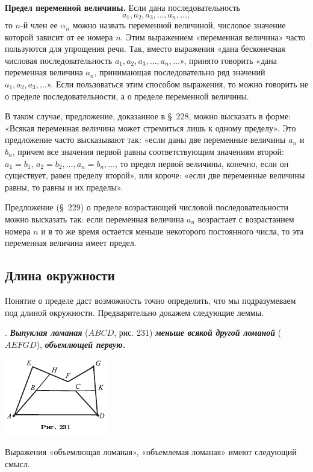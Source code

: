 \documentclass[oneside]{book}
\begin{document}
\textbf{Предел переменной величины.}
Если дана последовательность 
\[a_1, a_2, a_3,\dots,a_n,\dots,\]
то $n$-й член ее $\alpha_n$ можно назвать переменной величиной, числовое значение которой зависит от ее номера $n$.
Этим выражением «переменная величина» часто пользуются для упрощения речи.
Так, вместо выражения «дана бесконечная числовая последовательность $a_1, a_2, a_3,\dots,a_n,\dots$», принято говорить «дана переменная величина $a_n$, принимающая последовательно ряд значений $a_1, a_2, a_3,\dots$».
Если пользоваться этим способом выражения, то можно говорить не о пределе последовательности, а о пределе переменной величины.

В таком случае, предложение, доказанное в §~228, можно высказать в форме:
«Всякая переменная величина может стремиться лишь к одному пределу».
Это предложение часто высказывают так:
«если даны две переменные величины $a_n$ и $b_n$, причем все значения первой равны соответствующим значениям второй:
$a_1=b_1$,
$a_2=b_2,\dots, a_n=b_n,\dots$, то предел первой величины, конечно, если он существует, равен пределу второй», или короче:
«если две переменные величины равны, то равны и их пределы».

Предложение (§~229) о пределе возрастающей числовой последовательности можно высказать так:
если переменная величина $a_n$ возрастает с возрастанием номера $n$ и в то же время остается меньше некоторого постоянного числа, то эта переменная величина имеет предел.

\subsection*{Длина окружности}

Понятие о пределе даст возможность точно определить, что мы подразумеваем под длиной окружности.
Предварительно докажем следующие леммы.

.
\textbf{\emph{Выпуклая ломаная}} ($ABCD$, рис. 231) \textbf{\emph{меньше всякой другой ломаной}} ($AEFGD$), \textbf{\emph{объемлющей первую.}}

\includegraphics{pics/ris-231}

Выражения «объемлющая ломаная», «объемлемая ломаная» имеют следующий смысл.
\end{document}
